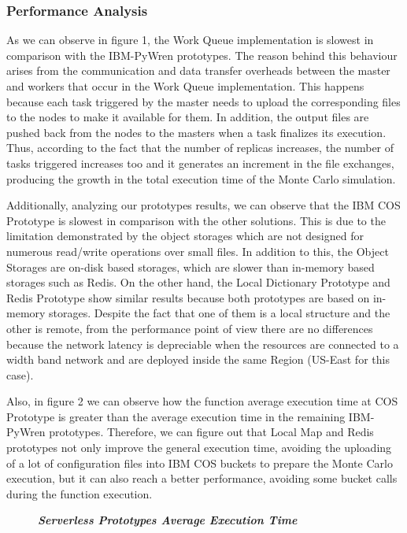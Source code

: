 \documentclass[sigplan, screen]{acmart}
\begin{document}
\subsubsection{Performance Analysis}
As we can observe in figure 1, the Work Queue implementation is slowest in comparison with the IBM-PyWren prototypes. The reason behind this behaviour arises from  the communication and data transfer overheads between the master and workers that occur in the Work Queue implementation. This happens because each task triggered by the master needs to upload the corresponding files to the nodes to make it available for them. In addition, the output files are pushed back from the nodes to the masters when a task finalizes its execution. Thus, according to the fact that the number of replicas increases, the number of tasks triggered increases too and it generates an increment in the file exchanges, producing the growth in the total execution time of the Monte Carlo simulation.

Additionally, analyzing our prototypes results, we can observe that the IBM COS Prototype is slowest in comparison with the other solutions. This is due to the limitation demonstrated by the object storages which are not designed for numerous read/write operations over small files. In addition to this, the Object Storages are on-disk based storages, which are slower than in-memory based storages such as Redis. On the other hand, the Local Dictionary Prototype and Redis Prototype show similar results because both prototypes are based on in-memory storages. Despite the fact that one of them is a local structure and the other is remote, from the performance point of view there are no differences because the network latency is depreciable when the resources are connected to a width band network and are deployed inside the same Region (US-East for this case).

Also, in figure 2 we can observe how the function average execution time at COS Prototype is greater than the average execution time in the remaining IBM-PyWren prototypes. Therefore, we can figure out that Local Map and Redis prototypes not only improve the general execution time, avoiding the uploading of a lot of configuration files into IBM COS buckets to prepare the Monte Carlo execution, but it can also reach a better performance, avoiding some bucket calls during the function execution.


\pgfplotsset{compat=1.14}
\begin{figure}[t]
\caption{\textit{\textbf{Serverless Prototypes Average Execution Time}}}
\end{figure}
\end{document}
